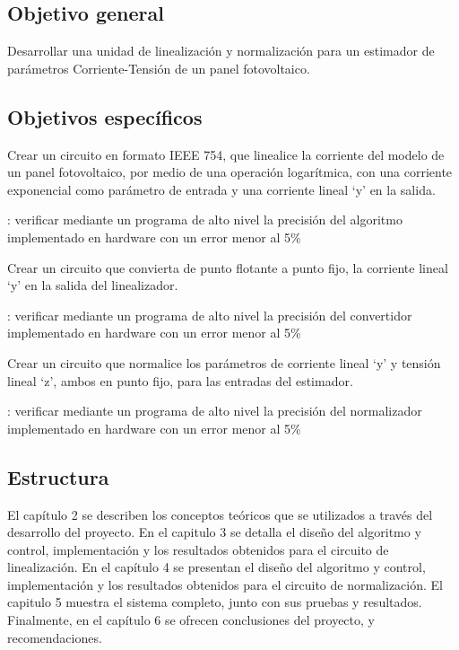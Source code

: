 \subsection{Objetivo general}

Desarrollar una unidad de linealización y normalización para un 	estimador de parámetros Corriente-Tensión de un panel fotovoltaico.

\subsection{Objetivos específicos}

\begin{compactitem}
\item Crear un circuito en formato IEEE 754, que linealice la corriente del modelo de un panel fotovoltaico, por medio de una operación logarítmica, con una corriente exponencial como parámetro de entrada y una corriente lineal ‘y’ en la salida.

: verificar mediante un programa de alto nivel la precisión del algoritmo implementado en hardware con un error menor al 5\%

\item Crear un circuito que convierta de punto flotante a punto fijo, la corriente lineal ‘y’ en la salida del linealizador.

: verificar mediante un programa de alto nivel la precisión del convertidor implementado en hardware con un error menor al 5\%

\item Crear un circuito que normalice los parámetros de corriente lineal ‘y’ y tensión lineal ‘z’, ambos en punto fijo, para las entradas del estimador. 

: verificar mediante un programa de alto nivel la precisión del normalizador implementado en hardware con un error menor al 5\%


\end{compactitem}

\subsection{Estructura}
El capítulo 2 se describen los conceptos teóricos que se utilizados a través del desarrollo del proyecto. En el capitulo 3 se detalla el diseño del algoritmo y control, implementación y los resultados obtenidos para el circuito de linealización. En el capítulo 4 se presentan el diseño del algoritmo y control, implementación y los resultados obtenidos para el circuito de normalización. El capitulo 5 muestra el sistema completo, junto con sus pruebas y resultados.  Finalmente, en el capítulo 6 se ofrecen
conclusiones del proyecto, y recomendaciones.




